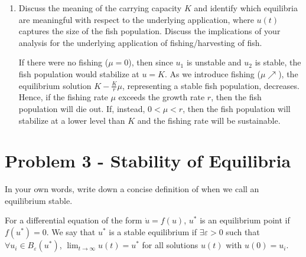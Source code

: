 \documentclass[12pt]{article}
\newcommand{\ep}{\varepsilon}
\begin{document}
\begin{enumerate}
\begin{center}
          \end{center}
    \item Discuss the meaning of the carrying capacity $K$ and identify which equilibria are meaningful with respect to
          the underlying application, where $u(t)$ captures the size of the fish population. Discuss the implications of your analysis for the underlying application of fishing/harvesting of fish.

          \color{blue}
          If there were no fishing ($\mu = 0$), then since $u_1$ is unstable and $u_2$ is stable, the fish population would stabilize at $u = K$. As we introduce fishing ($\mu \nearrow$), the equilibrium solution $K - \frac{K}{r}\mu$, representing a stable fish population, decreases. Hence, if the fishing rate $\mu$ exceeds the growth rate $r$, then the fish population will die out. If, instead, $0 < \mu < r$, then the fish population will stabilize at a lower level than $K$ and the fishing rate will be sustainable.
          \color{black}
\end{enumerate}

\pagebreak

\section*{Problem 3 - Stability of Equilibria}

In your own words, write down a concise definition of when we call an equilibrium stable.

\color{blue}
For a differential equation of the form $\dot u = f(u)$, $u^*$ is an equilibrium point if $f(u^*) = 0$. We say that $u^*$ is a stable equilibrium if $\exists \ep > 0$ such that $\forall u_i \in B_\ep(u^*)$, $\lim_{t\to\infty} u(t) = u^*$ for all solutions $u(t)$ with $u(0) = u_i$.
\end{document}
